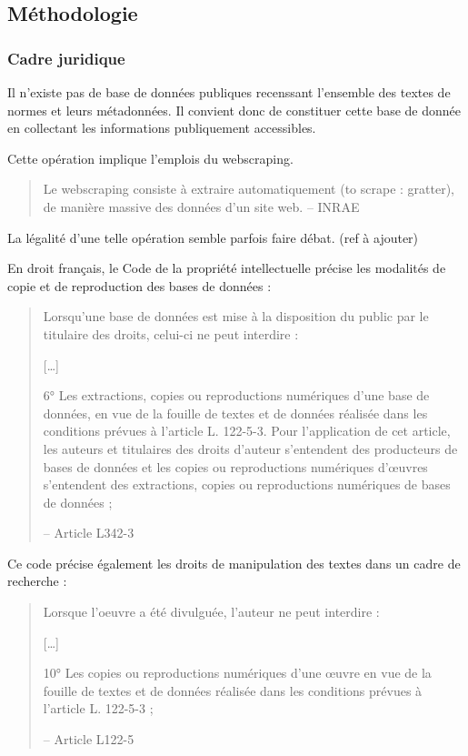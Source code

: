 \documentclass[a4paper,12pt]{article}
\begin{document}
\subsection{Méthodologie}
\label{sec:org19b9b95}
\subsubsection{Cadre juridique}
\label{sec:org36ddb86}
Il n'existe pas de base de données publiques recenssant l'ensemble des textes de normes et leurs métadonnées. Il convient donc de constituer cette base de donnée en collectant les informations publiquement accessibles.

Cette opération implique l'emplois du webscraping.

\begin{quote}
Le webscraping consiste à extraire automatiquement (to scrape : gratter), de manière massive des données d'un site web. -- INRAE\autocite{quesnevilleRecommandationsUsagesWebscraping2024}
\end{quote}

La légalité d'une telle opération semble parfois faire débat. (ref à ajouter)

En droit français, le Code de la propriété intellectuelle précise les modalités de copie et de reproduction des bases de données :
\begin{quote}
Lorsqu'une base de données est mise à la disposition du public par le titulaire des droits, celui-ci ne peut interdire :

{[}\ldots{}]

6° Les extractions, copies ou reproductions numériques d'une base de données, en vue de la fouille de textes et de données réalisée dans les conditions prévues à l'article L. 122-5-3. Pour l'application de cet article, les auteurs et titulaires des droits d'auteur s'entendent des producteurs de bases de données et les copies ou reproductions numériques d'œuvres s'entendent des extractions, copies ou reproductions numériques de bases de données ;

-- Article L342-3\autocite{CodeProprieteIntellectuelle}
\end{quote}

Ce code précise également les droits de manipulation des textes dans un cadre de recherche :
\begin{quote}
Lorsque l'oeuvre a été divulguée, l'auteur ne peut interdire :

{[}\ldots{}]

10° Les copies ou reproductions numériques d'une œuvre en vue de la fouille de textes et de données réalisée dans les conditions prévues à l'article L. 122-5-3 ;

-- Article L122-5\autocite{CodeProprieteIntellectuelle}
\end{quote}
\end{document}
